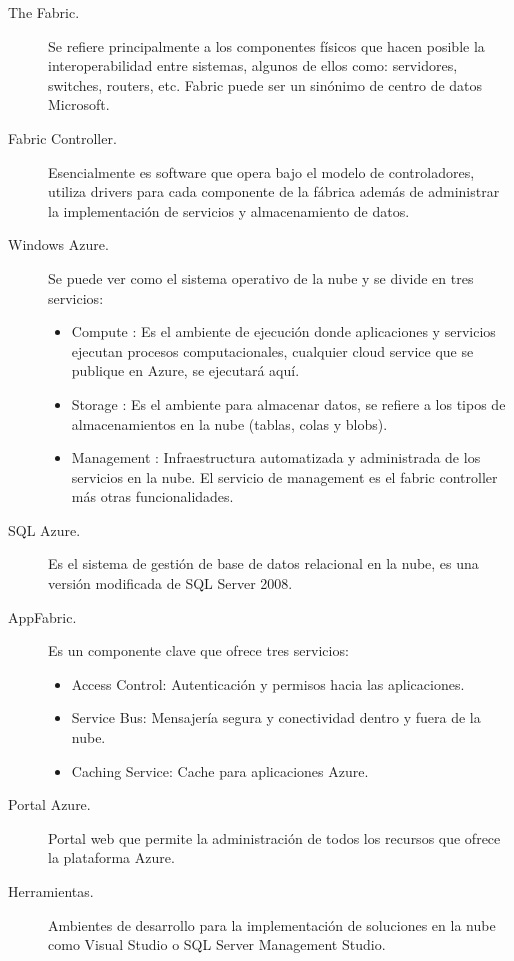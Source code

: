 \begin{description}
    \item [The Fabric.] Se refiere principalmente a los componentes físicos que hacen posible la interoperabilidad entre sistemas, algunos de ellos como: servidores, switches, routers, etc. Fabric puede ser un sinónimo de centro de datos Microsoft.

    \item [Fabric Controller.] Esencialmente es software que opera bajo el modelo de controladores, utiliza drivers para cada componente de la fábrica además de administrar la implementación de servicios y almacenamiento de datos.

    \item [Windows Azure.] Se puede ver como el sistema operativo de la nube y se divide en tres servicios:
          \begin{itemize}
              \item Compute : Es el ambiente de ejecución donde aplicaciones y servicios ejecutan procesos computacionales, cualquier cloud service que se publique en Azure, se ejecutará aquí.
              \item  Storage : Es el ambiente para almacenar datos, se refiere a los tipos de almacenamientos en la nube (tablas, colas y blobs).
              \item Management : Infraestructura automatizada y administrada de los servicios en la nube.  El servicio de management es el fabric controller más otras funcionalidades.
          \end{itemize}

    \item [SQL Azure.] Es el sistema de gestión de base de datos relacional en la nube, es una versión modificada de SQL Server 2008.

    \item [AppFabric.] Es un componente clave que ofrece tres servicios:

          \begin{itemize}
              \item Access Control: Autenticación y permisos hacia las aplicaciones.
              \item  Service Bus: Mensajería segura y conectividad dentro y fuera de la nube.
              \item Caching Service: Cache para aplicaciones Azure.
          \end{itemize}

    \item [Portal Azure.] Portal web que permite la administración de todos los recursos que ofrece la plataforma Azure.

    \item [Herramientas.] Ambientes de desarrollo para la implementación de soluciones en la nube como Visual Studio o SQL Server Management Studio.

\end{description}

